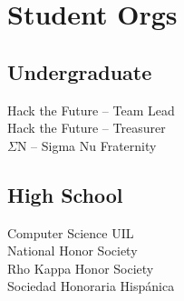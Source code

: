 \documentclass[letterpaper]{deedy-resume} %
\begin{document}
\begin{minipage}[t]{0.33\textwidth}
\section{Student Orgs}

\subsection{Undergraduate}

Hack the Future -- Team Lead \\
Hack the Future -- Treasurer \\
$\Sigma$N -- Sigma Nu Fraternity
\sectionspace %


\subsection{High School}

Computer Science UIL  \\
National Honor Society \\
Rho Kappa Honor Society \\
Sociedad Honoraria Hispánica \\

\sectionspace %


\end{minipage} %
\hfill
%
%
\end{document}
